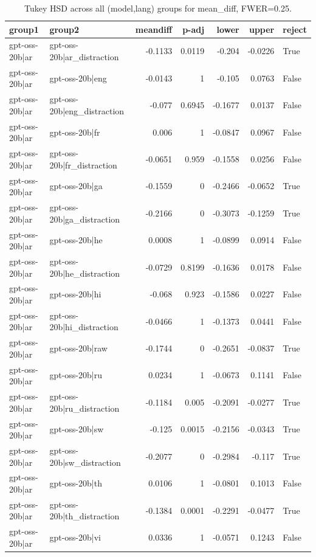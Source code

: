\begin{table}
\caption{Tukey HSD across all (model,lang) groups for mean_diff, FWER=0.25.}
\label{tab:tukey_all_models_all_langs_mean_diff}
\begin{tabular}{l l r r r r l}
\toprule
group1 & group2 & meandiff & p-adj & lower & upper & reject \\
\midrule
gpt-oss-20b|ar & gpt-oss-20b|ar_distraction & -0.1133 & 0.0119 & -0.204 & -0.0226 & True \\
gpt-oss-20b|ar & gpt-oss-20b|eng & -0.0143 & 1 & -0.105 & 0.0763 & False \\
gpt-oss-20b|ar & gpt-oss-20b|eng_distraction & -0.077 & 0.6945 & -0.1677 & 0.0137 & False \\
gpt-oss-20b|ar & gpt-oss-20b|fr & 0.006 & 1 & -0.0847 & 0.0967 & False \\
gpt-oss-20b|ar & gpt-oss-20b|fr_distraction & -0.0651 & 0.959 & -0.1558 & 0.0256 & False \\
gpt-oss-20b|ar & gpt-oss-20b|ga & -0.1559 & 0 & -0.2466 & -0.0652 & True \\
gpt-oss-20b|ar & gpt-oss-20b|ga_distraction & -0.2166 & 0 & -0.3073 & -0.1259 & True \\
gpt-oss-20b|ar & gpt-oss-20b|he & 0.0008 & 1 & -0.0899 & 0.0914 & False \\
gpt-oss-20b|ar & gpt-oss-20b|he_distraction & -0.0729 & 0.8199 & -0.1636 & 0.0178 & False \\
gpt-oss-20b|ar & gpt-oss-20b|hi & -0.068 & 0.923 & -0.1586 & 0.0227 & False \\
gpt-oss-20b|ar & gpt-oss-20b|hi_distraction & -0.0466 & 1 & -0.1373 & 0.0441 & False \\
gpt-oss-20b|ar & gpt-oss-20b|raw & -0.1744 & 0 & -0.2651 & -0.0837 & True \\
gpt-oss-20b|ar & gpt-oss-20b|ru & 0.0234 & 1 & -0.0673 & 0.1141 & False \\
gpt-oss-20b|ar & gpt-oss-20b|ru_distraction & -0.1184 & 0.005 & -0.2091 & -0.0277 & True \\
gpt-oss-20b|ar & gpt-oss-20b|sw & -0.125 & 0.0015 & -0.2156 & -0.0343 & True \\
gpt-oss-20b|ar & gpt-oss-20b|sw_distraction & -0.2077 & 0 & -0.2984 & -0.117 & True \\
gpt-oss-20b|ar & gpt-oss-20b|th & 0.0106 & 1 & -0.0801 & 0.1013 & False \\
gpt-oss-20b|ar & gpt-oss-20b|th_distraction & -0.1384 & 0.0001 & -0.2291 & -0.0477 & True \\
gpt-oss-20b|ar & gpt-oss-20b|vi & 0.0336 & 1 & -0.0571 & 0.1243 & False \\

\end{tabular}
\end{table}
